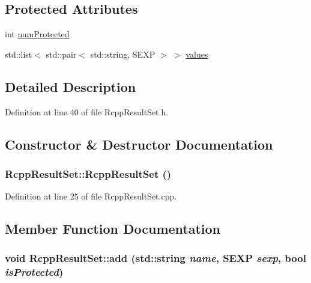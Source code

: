 \subsection*{Protected Attributes}
\begin{DoxyCompactItemize}
\item 
int \hyperlink{classRcppResultSet_a19edd02ac05783f9b4fd840c22e74153}{numProtected}
\item 
std::list$<$ std::pair$<$ std::string, SEXP $>$ $>$ \hyperlink{classRcppResultSet_a509f3d779c88476dea89ade9c08d403f}{values}
\end{DoxyCompactItemize}


\subsection{Detailed Description}


Definition at line 40 of file RcppResultSet.h.

\subsection{Constructor \& Destructor Documentation}
\hypertarget{classRcppResultSet_ab799c6b9bd730e55d92228203903ba74}{
\subsubsection[{RcppResultSet}]{\setlength{\rightskip}{0pt plus 5cm}RcppResultSet::RcppResultSet ()}}
\label{classRcppResultSet_ab799c6b9bd730e55d92228203903ba74}


Definition at line 25 of file RcppResultSet.cpp.

\subsection{Member Function Documentation}
\hypertarget{classRcppResultSet_a5f44a63a2cab43db551c0e27d6fec378}{
\subsubsection[{add}]{\setlength{\rightskip}{0pt plus 5cm}void RcppResultSet::add (std::string {\em name}, \/  SEXP {\em sexp}, \/  bool {\em isProtected})}}
\label{classRcppResultSet_a5f44a63a2cab43db551c0e27d6fec378}


